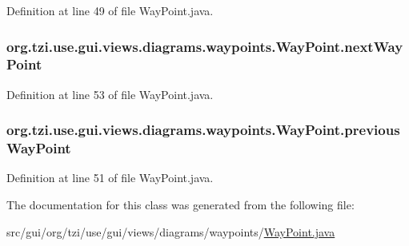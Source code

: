 Definition at line 49 of file Way\-Point.\-java.

\hypertarget{classorg_1_1tzi_1_1use_1_1gui_1_1views_1_1diagrams_1_1waypoints_1_1_way_point_a474962722f712c8477509df9e9cf60fc}{
\subsubsection[{next\-Way\-Point}]{ org.\-tzi.\-use.\-gui.\-views.\-diagrams.\-waypoints.\-Way\-Point.\-next\-Way\-Point\hspace{0.3cm}{\ttfamily [protected]}}}\label{classorg_1_1tzi_1_1use_1_1gui_1_1views_1_1diagrams_1_1waypoints_1_1_way_point_a474962722f712c8477509df9e9cf60fc}


Definition at line 53 of file Way\-Point.\-java.

\hypertarget{classorg_1_1tzi_1_1use_1_1gui_1_1views_1_1diagrams_1_1waypoints_1_1_way_point_acfbb3ccd53ce4deaf5a8240d49367125}{
\subsubsection[{previous\-Way\-Point}]{ org.\-tzi.\-use.\-gui.\-views.\-diagrams.\-waypoints.\-Way\-Point.\-previous\-Way\-Point\hspace{0.3cm}{\ttfamily [protected]}}}\label{classorg_1_1tzi_1_1use_1_1gui_1_1views_1_1diagrams_1_1waypoints_1_1_way_point_acfbb3ccd53ce4deaf5a8240d49367125}


Definition at line 51 of file Way\-Point.\-java.



The documentation for this class was generated from the following file\-:\begin{DoxyCompactItemize}
\item 
src/gui/org/tzi/use/gui/views/diagrams/waypoints/\hyperlink{_way_point_8java}{Way\-Point.\-java}\end{DoxyCompactItemize}
